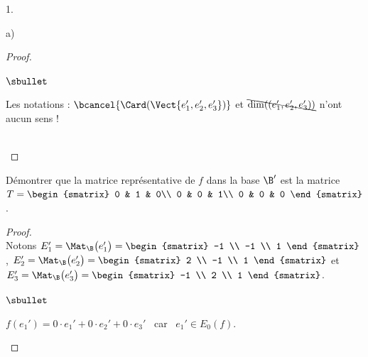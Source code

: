 \documentclass[11pt]{article}%
\begin{document}
\begin{noliste}{1.}
\begin{noliste}{a)}
\begin{proof}
\begin{remark}
\begin{noliste}{$\sbullet$}
        \item Les notations : $\bcancel{\Card(\Vect{e'_1, e'_2,
              e'_3})}$ et $\bcancel{\dim((e'_1, e'_2, e'_3))}$ n'ont
          aucun sens !
        \end{noliste}
      \end{remark}~\\[-1.4cm]
    \end{proof}


    \newpage

    
  \item Démontrer que la matrice représentative de $f$ dans la base
    $\B'$ est la matrice $T =
    \begin{smatrix}
      0 & 1 & 0\\
      0 & 0 & 1\\
      0 & 0 & 0
    \end{smatrix}$.

    \begin{proof}~\\
      Notons $E_1' = \Mat_{\B}\big( e_1' \big) =
      \begin{smatrix}
        -1 \\
        -1 \\
        1
      \end{smatrix}
      $, $E_2' = \Mat_{\B}\big( e_2' \big) =
      \begin{smatrix}
        2 \\
        -1 \\
        1
      \end{smatrix}
      $ et $E_3' = \Mat_{\B}\big( e_3' \big) =
      \begin{smatrix}
        -1 \\
        2 \\
        1
      \end{smatrix}
      $.
      \begin{noliste}{$\sbullet$}
      \item $f(e_1' ) = 0 \cdot e_1' + 0 \cdot e_2' + 0 \cdot e_3'$ \
        car \ $e_1' \in E_0(f)$.%


\end{noliste}
\end{proof}
\end{noliste}
\end{noliste}
\end{document}
